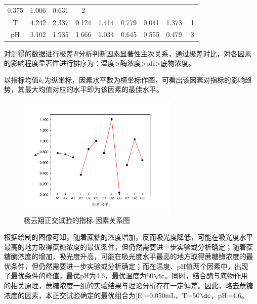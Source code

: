 \begin{enumerate}
\begin{table}[H]
\begin{tabular}{@{}clclclclclclclclcl@{}}
  \multicolumn{2}{c}{0.375} &
  \multicolumn{2}{c}{1.006} &
  \multicolumn{2}{c}{0.631} &
  \multicolumn{2}{c}{2} \\
\multicolumn{2}{c}{T} &
 \multicolumn{2}{c}{4.242} &
  \multicolumn{2}{c}{2.337} &
  \multicolumn{2}{c}{0.124} &
  \multicolumn{2}{c}{1.414} &
  \multicolumn{2}{c}{0.779} &
  \multicolumn{2}{c}{0.041} &
  \multicolumn{2}{c}{1.373} &
  \multicolumn{2}{c}{1} \\
\multicolumn{2}{c}{pH} &
 \multicolumn{2}{c}{3.102} &
  \multicolumn{2}{c}{1.935} &
  \multicolumn{2}{c}{1.666} &
  \multicolumn{2}{c}{1.034} &
  \multicolumn{2}{c}{0.645} &
  \multicolumn{2}{c}{0.555} &
  \multicolumn{2}{c}{0.479} &
  \multicolumn{2}{c}{3} \\ \bottomrule
\end{tabular}
\end{table}

对测得的数据进行极差$R$分析判断因素显著性主次关系，通过极差对比，对各因素的影响程度显著性进行排序为：温度>酶浓度>pH>底物浓度。

以指标均值$k_i$为纵坐标，因素水平数为横坐标作图，可看出该因素对指标的影响趋势，其最大均值对应的水平即为该因素的最佳水平。

\begin{figure}[H]
    \centering
    \includegraphics[width = 0.7\textwidth]{figure/Some Pictures/figure-1.png}
    \caption{杨云翔正交试验的指标-因素关系图}
    \label{fig:enter-label}
\end{figure}

根据绘制的图像可知，随着蔗糖的浓度增加，反而吸光度降低，可能在吸光度水平最高的地方取得蔗糖浓度的最优条件，但仍然需要进一步实验或分析确定；随着蔗糖酶浓度的增加，吸光度升高，可能在吸光度水平最高的地方取得蔗糖酶浓度的最优条件，但仍然需要进一步实验或分析确定；而在温度、pH值两个因素中，出现了最优条件的峰值，最优pH为4.6，最优温度为50$\dc$。同时，结合酶与底物作用的相关原理，蔗糖浓度一组的实验结果与理论分析存在一定偏差。因此，略去蔗糖浓度的因素，本正交试验确定的最优组合为[E]=0.050mL，T=50$\dc$，pH=4.6。


\end{enumerate}
